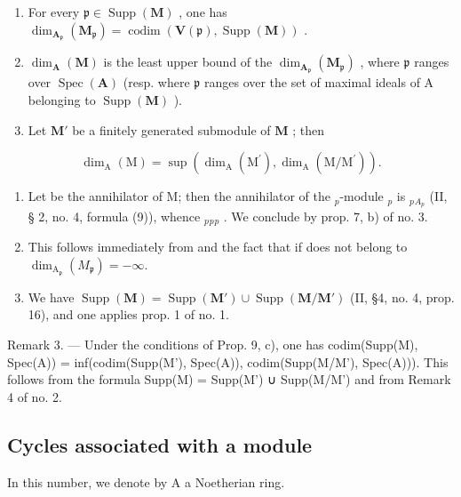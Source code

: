 \begin{enumerate}
\def\labelenumi{\alph{enumi})}
\item
  For every \(\mathfrak{p} \in \operatorname{Supp}(\mathbf{M})\) , one has \(\dim_{\mathbf{A}_{\mathfrak{p}}}(\mathbf{M}_{\mathfrak{p}}) = \operatorname{codim}(\mathbf{V}(\mathfrak{p}), \operatorname{Supp}(\mathbf{M}))\) .
\item
  \(\dim_{\mathbf{A}}(\mathbf{M})\) is the least upper bound of the \(\dim_{\mathbf{A}_{\mathfrak{p}}}(\mathbf{M}_{\mathfrak{p}})\) , where \(\mathfrak{p}\) ranges over \(\operatorname{Spec}(\mathbf{A})\) (resp. where \(\mathfrak{p}\) ranges over the set of maximal ideals of A belonging to \(\operatorname{Supp}(\mathbf{M})\) ).
\item
  Let \(\mathbf{M}'\) be a finitely generated submodule of \(\mathbf{M}\) ; then
\end{enumerate}

\[
\dim_ {\mathrm{A}} (\mathrm{M}) = \sup \left(\dim_ {\mathrm{A}} \left(\mathrm{M} ^ {\prime}\right), \dim_ {\mathrm{A}} \left(\mathrm{M} / \mathrm{M} ^ {\prime}\right)\right).
\]

\begin{enumerate}
\def\labelenumi{\alph{enumi})}
\item
  Let  be the annihilator of M; then the annihilator of the \(_{p}\)-module \(_{p}\) is \(_{p}\)\(_{A_{p}}\) (II, § 2, no. 4, formula (9)), whence \(_{p}\)\(_{p}\)\(_{p}\) . We conclude by prop. 7, b) of no. 3.
\item
  This follows immediately from  and the fact that  if  does not belong to \(\dim_{\mathrm{A}_{\mathfrak{p}}}(M_{\mathfrak{p}}) = -\infty\).
\item
  We have \(\operatorname{Supp}(\mathbf{M}) = \operatorname{Supp}(\mathbf{M}') \cup \operatorname{Supp}(\mathbf{M} / \mathbf{M}')\) (II, §4, no. 4, prop. 16), and one applies prop. 1 of no. 1.
\end{enumerate}

Remark 3. --- Under the conditions of Prop. 9, c), one has codim(Supp(M), Spec(A)) = inf(codim(Supp(M'), Spec(A)), codim(Supp(M/M'), Spec(A))). This follows from the formula Supp(M) = Supp(M') ∪ Supp(M/M') and from Remark 4 of no. 2.

\subsection{Cycles associated with a module}

In this number, we denote by A a Noetherian ring.

